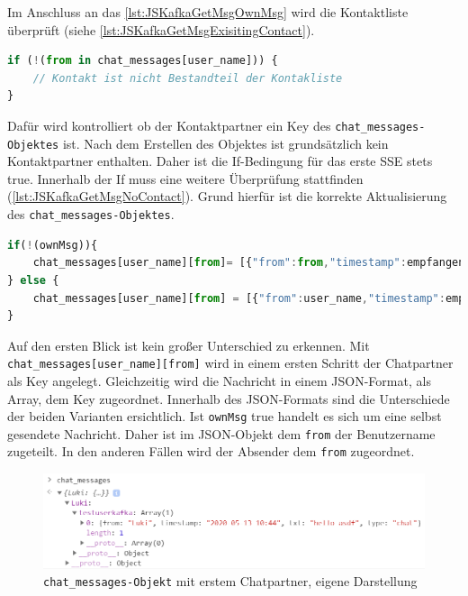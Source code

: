 \documentclass[a4paper,titlepage,halfparskip,12pt]{scrreprt}
\begin{document}
\begin{onehalfspacing}
Im Anschluss an das \autoref{lst:JSKafkaGetMsgOwnMsg} wird die Kontaktliste überprüft (siehe \autoref{lst:JSKafkaGetMsgExisitingContact}).
\begin{lstlisting}[language=Javascript,caption=Überprüfung der Kontaktliste,label={lst:JSKafkaGetMsgExisitingContact}]
if (!(from in chat_messages[user_name])) {
	// Kontakt ist nicht Bestandteil der Kontakliste
}
\end{lstlisting}
Dafür wird kontrolliert ob der Kontaktpartner ein Key des \texttt{chat\_messages-Objektes} ist. Nach dem Erstellen des Objektes ist grundsätzlich kein Kontaktpartner enthalten. Daher ist die If-Bedingung für das erste \ac{SSE} stets true. Innerhalb der If muss eine weitere Überprüfung stattfinden (\autoref{lst:JSKafkaGetMsgNoContact}). Grund hierfür ist die korrekte Aktualisierung des \texttt{chat\_messages-Objektes}.
\begin{lstlisting}[language=Javascript,caption=Weitere Ausführung in Abhängigkeit des Empfängers,label={lst:JSKafkaGetMsgNoContact}]
if(!(ownMsg)){
	chat_messages[user_name][from]= [{"from":from,"timestamp":empfangenMsg.timestamp, "txt":empfangenMsg.msg, "type": "chat"}]
} else {
	chat_messages[user_name][from] = [{"from":user_name,"timestamp":empfangenMsg.timestamp, "txt":empfangenMsg.msg, "type": "chat"}]
}
\end{lstlisting}
Auf den ersten Blick ist kein großer Unterschied zu erkennen. Mit \texttt{chat\_messages[user\_name][from]} wird in einem ersten Schritt der Chatpartner als Key angelegt. Gleichzeitig wird die Nachricht in einem JSON-Format, als Array, dem Key zugeordnet. Innerhalb des JSON-Formats sind die Unterschiede der beiden Varianten ersichtlich. Ist \texttt{ownMsg} true handelt es sich um eine selbst gesendete Nachricht. Daher ist im JSON-Objekt dem \texttt{\dq from\dq} der Benutzername zugeteilt. In den anderen Fällen wird der Absender dem \texttt{\dq from\dq} zugeordnet.
\begin{figure}[h]
	\centering
	\includegraphics[scale=1.2]{images/Chat_messageObjectFirstInsertion}
	\caption{\texttt{chat\_messages-Objekt} mit erstem Chatpartner, eigene Darstellung}
	\label{img:Chat_messageObjectFirstInsertion}
\end{figure}

\end{onehalfspacing}
\end{document}
